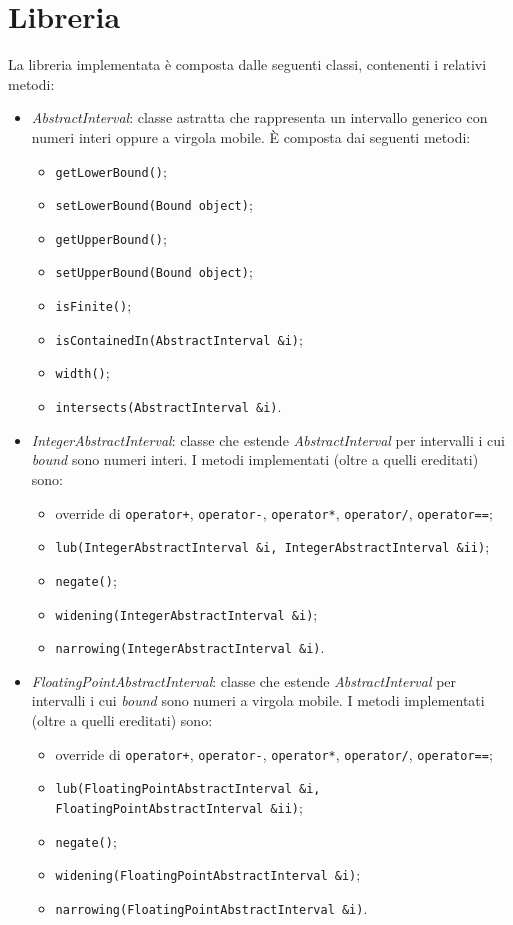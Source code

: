 \documentclass[a4paper, 10pt]{report}
\begin{document}
\section*{Libreria}
La libreria implementata è composta dalle seguenti classi, contenenti i relativi metodi:
\begin{itemize}
	\item \textit{AbstractInterval}: classe astratta che rappresenta un intervallo generico con numeri interi oppure a virgola mobile. È composta dai seguenti metodi:
	\begin{itemize}
		\item \verb|getLowerBound()|;
		\item \verb|setLowerBound(Bound object)|;
		\item \verb|getUpperBound()|;
		\item \verb|setUpperBound(Bound object)|;
		\item \verb|isFinite()|;
		\item \verb|isContainedIn(AbstractInterval &i)|;
		\item \verb|width()|;
		\item \verb|intersects(AbstractInterval &i)|.
	\end{itemize}
	\item \textit{IntegerAbstractInterval}: classe che estende \textit{AbstractInterval} per intervalli i cui \textit{bound} sono numeri interi. I metodi implementati (oltre a quelli ereditati) sono:
	\begin{itemize}
		\item override di \verb|operator+|, \verb|operator-|, \verb|operator*|, \verb|operator/|, \verb|operator==|;
		\item \verb|lub(IntegerAbstractInterval &i, IntegerAbstractInterval &ii)|;
		\item \verb|negate()|;
		\item \verb|widening(IntegerAbstractInterval &i)|;
		\item \verb|narrowing(IntegerAbstractInterval &i)|.
	\end{itemize}
	\item \textit{FloatingPointAbstractInterval}: classe che estende \textit{AbstractInterval} per intervalli i cui \textit{bound} sono numeri a virgola mobile. I metodi implementati (oltre a quelli ereditati) sono:
		\begin{itemize}
			\item override di \verb|operator+|, \verb|operator-|, \verb|operator*|, \verb|operator/|, \verb|operator==|;
			\item \verb|lub(FloatingPointAbstractInterval &i, FloatingPointAbstractInterval &ii)|;
			\item \verb|negate()|;
			\item \verb|widening(FloatingPointAbstractInterval &i)|;
			\item \verb|narrowing(FloatingPointAbstractInterval &i)|.
		\end{itemize}
	

\end{itemize}
\end{document}
